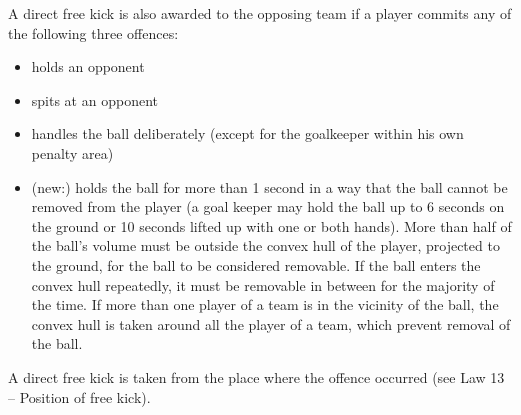
\bigskip

{\color{magenta}
A direct free kick is also awarded to the opposing team if a player commits any of the following three offences: 

\begin{itemize}
\item holds an opponent
\item spits at an opponent
\item handles the ball deliberately (except for the goalkeeper within his own penalty area)
\item (new:) holds the ball for more than 1 second in a way that the ball cannot be removed from the player (a goal keeper may hold the ball up to 6 seconds on the ground or 10 seconds lifted up with one or both hands). More than half of the ball's volume must be outside the convex hull of the player, projected to the ground, for the ball to be considered removable. If the ball enters the convex hull repeatedly, it must be removable in between for the majority of the time. If more than one player of a team is in the vicinity of the ball, the convex hull is taken around all the player of a team, which prevent removal of the ball.
\end{itemize}

\bigskip


A direct free kick is taken from the place where the offence occurred (see Law 13 -- Position of free kick).
}




